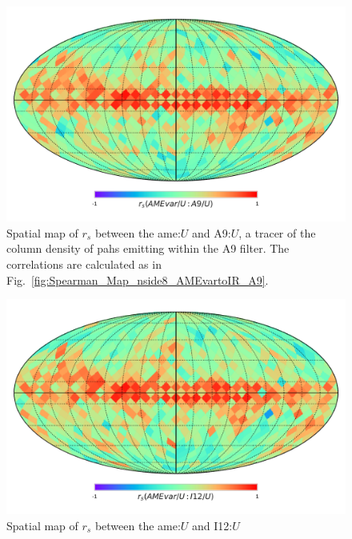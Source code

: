      \begin{figure}
       \includegraphics[width=\textwidth/2]{../Plots/Allsky_Corr/UNorm/Spearman_Map_nside8_AMEvartoA9.pdf}
       \centering
       \caption{Spatial map of $r_{s}$ between the \acrshort{ame}:$U$ and A9:$U$, a tracer of the column density of \acrshort{pah}s emitting within the A9 filter. The correlations are calculated as in Fig.~\ref{fig:Spearman_Map_nside8_AMEvartoIR_A9}.}
       \label{fig:Spearman_Map_nside8_AMEvartoIR_UNorm_A9}
     \end{figure}
     \begin{figure}
       \includegraphics[width=\textwidth/2]{../Plots/Allsky_Corr/UNorm/Spearman_Map_nside8_AMEvartoI12.pdf}
       \centering
       \caption{Spatial map of $r_{s}$ between the \acrshort{ame}:$U$ and I12:$U$}
       \label{fig:Spearman_Map_nside8_AMEvartoIR_UNorm_I12}
     \end{figure}
